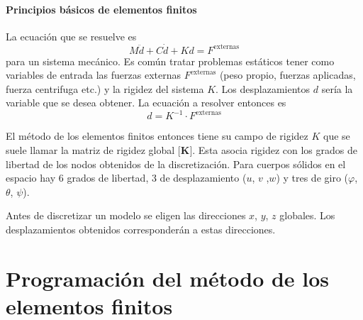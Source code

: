 \documentclass[11pt, a4paper,titlepage]{article}
\newcommand{\Mme}[1]{\boldsymbol{[}\mathbf{#1} \boldsymbol{]}}
\newcommand{\MK}{\Mme{K}}
\let\oldpart\part
\renewcommand{\part}[1]{\clearpage \oldpart{#1}}
\begin{document}
\subsection*{Principios básicos de elementos finitos}

La ecuación que se resuelve es
\[
M\ddot{d} + C\dot{d} + Kd = F^{\mathrm{externas}}
\]
para un sistema mecánico. Es común tratar problemas estáticos tener como variables de entrada las fuerzas externas $F^{\mathrm{externas}}$ (peso propio, fuerzas aplicadas, fuerza centrifuga etc.) y la rigidez del sistema $K$. Los desplazamientos $d$ sería la variable que se desea obtener. La ecuación a resolver entonces es
\[
d =K^{-1} \cdot F^{\mathrm{externas}}
\]

El método de los elementos finitos entonces tiene su campo de rigidez $K$ que se suele llamar la matriz de rigidez global $\MK$. Esta asocia rigidez con los grados de libertad de los nodos obtenidos de la discretización. Para cuerpos sólidos en el espacio hay 6 grados de libertad, 3 de desplazamiento ($u$, $v$ ,$w$) y tres de giro ($\varphi$, $\theta$, $\psi$). 

Antes de discretizar un modelo se eligen las direcciones $x$, $y$, $z$ globales. Los desplazamientos obtenidos corresponderán a estas direcciones.

\part{Programación del método de los elementos finitos}

\newcommand{\Numberof}{N}
\newcommand{\Numberlocal}{n}
\newcommand{\DOF}{\vartheta}
\newcommand{\Nnod}{\ensuremath{\Numberof_{\mathrm{nod.}}}}
\newcommand{\Ndims}{\ensuremath{\Numberof_{\mathrm{dim.}}}}
\newcommand{\Nelem}{\ensuremath{\Numberof_{\mathrm{elem.}}}}
\newcommand{\Ndofpornod}{\ensuremath{\DOF_{\mathrm{nod.}}}}
\newcommand{\Ndof}{\ensuremath{\Numberof_{\mathrm{dof}}}}

\newcommand{\Nnodporelem}{\ensuremath{\Numberlocal_{\mathrm{nod.}}}}
\newcommand{\Ndofporelem}{\ensuremath{\Numberlocal_{\mathrm{dof}}}}
\end{document}

